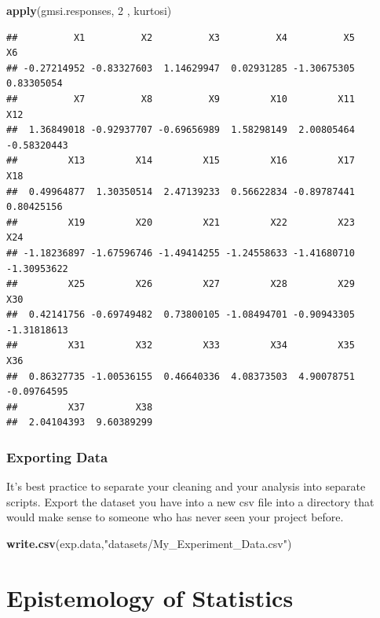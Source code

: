 \documentclass[]{book}
\newenvironment{Shaded}{\begin{snugshade}}{\end{snugshade}}
\newcommand{\KeywordTok}[1]{\textcolor[rgb]{0.13,0.29,0.53}{\textbf{#1}}}
\newcommand{\DecValTok}[1]{\textcolor[rgb]{0.00,0.00,0.81}{#1}}
\newcommand{\StringTok}[1]{\textcolor[rgb]{0.31,0.60,0.02}{#1}}
\newcommand{\NormalTok}[1]{#1}
\theoremstyle{definition}
\theoremstyle{definition}
\theoremstyle{definition}
\theoremstyle{remark}
\begin{document}
\begin{Shaded}
\begin{Highlighting}[]
\KeywordTok{apply}\NormalTok{(gmsi.responses, }\DecValTok{2}\NormalTok{ , kurtosi)}
\end{Highlighting}
\end{Shaded}

\begin{verbatim}
##          X1          X2          X3          X4          X5          X6 
## -0.27214952 -0.83327603  1.14629947  0.02931285 -1.30675305  0.83305054 
##          X7          X8          X9         X10         X11         X12 
##  1.36849018 -0.92937707 -0.69656989  1.58298149  2.00805464 -0.58320443 
##         X13         X14         X15         X16         X17         X18 
##  0.49964877  1.30350514  2.47139233  0.56622834 -0.89787441  0.80425156 
##         X19         X20         X21         X22         X23         X24 
## -1.18236897 -1.67596746 -1.49414255 -1.24558633 -1.41680710 -1.30953622 
##         X25         X26         X27         X28         X29         X30 
##  0.42141756 -0.69749482  0.73800105 -1.08494701 -0.90943305 -1.31818613 
##         X31         X32         X33         X34         X35         X36 
##  0.86327735 -1.00536155  0.46640336  4.08373503  4.90078751 -0.09764595 
##         X37         X38 
##  2.04104393  9.60389299
\end{verbatim}

\subsection{Exporting Data}\label{exporting-data}

It's best practice to separate your cleaning and your analysis into
separate scripts. Export the dataset you have into a new csv file into a
directory that would make sense to someone who has never seen your
project before.

\begin{Shaded}
\begin{Highlighting}[]
\KeywordTok{write.csv}\NormalTok{(exp.data,}\StringTok{"datasets/My_Experiment_Data.csv"}\NormalTok{)}
\end{Highlighting}
\end{Shaded}

\chapter{Epistemology of Statistics}\label{epistemology-of-statistics}
\end{document}
